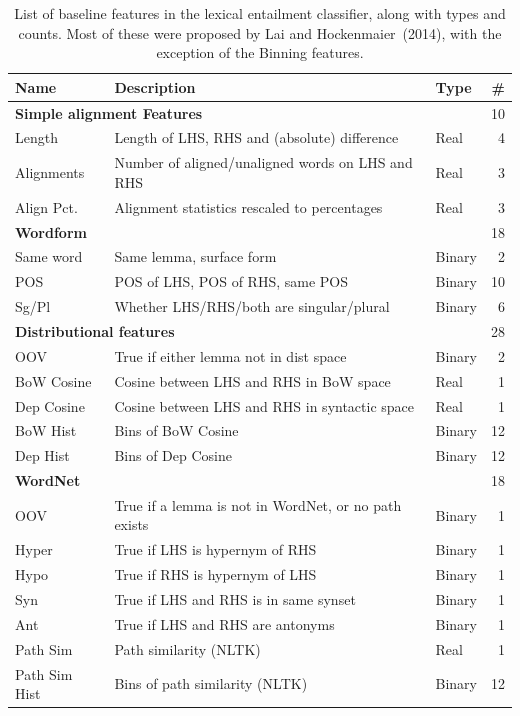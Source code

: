 \begin{table}
\centering
\begin{small}
\begin{tabular}{|lllr|}
    \hline
    \bf{Name} & \bf{Description} & \bf{Type} & \bf{\#}\\
    \hline\hline
    \multicolumn{3}{|l}{\bf{Simple alignment Features}} & 10 \\
    \hline
    Length & Length of LHS, RHS and (absolute) difference & Real & 4\\
    Alignments & Number of aligned/unaligned words on LHS and RHS & Real & 3\\
    Align Pct. & Alignment statistics rescaled to percentages & Real & 3\\
    \hline\hline
    \multicolumn{3}{|l}{\bf{Wordform}} & 18\\
    \hline
    Same word & Same lemma, surface form & Binary & 2\\
    POS & POS of LHS, POS of RHS, same POS & Binary & 10\\
    Sg/Pl & Whether LHS/RHS/both are singular/plural & Binary & 6\\
    \hline
    \hline
    \multicolumn{3}{|l}{\bf Distributional features} & 28\\
    \hline
    OOV & True if either lemma not in dist space & Binary & 2\\
    BoW Cosine & Cosine between LHS and RHS in BoW space & Real & 1\\
    Dep Cosine & Cosine between LHS and RHS in syntactic space & Real & 1\\
    BoW Hist & Bins of BoW Cosine & Binary & 12\\
    Dep Hist & Bins of Dep Cosine & Binary & 12\\
    \hline
    \hline
    \multicolumn{3}{|l}{\bf WordNet} & 18\\
    \hline
    OOV & True if a lemma is not in WordNet, or no path exists & Binary & 1\\
    Hyper & True if LHS is hypernym of RHS & Binary & 1\\
    Hypo & True if RHS is hypernym of LHS & Binary & 1\\
    Syn & True if LHS and RHS is in same synset & Binary & 1\\
    Ant & True if LHS and RHS are antonyms & Binary & 1\\
    Path Sim & Path similarity (NLTK) & Real & 1\\
    Path Sim Hist & Bins of path similarity (NLTK) & Binary & 12\\
    \hline
\end{tabular}
\caption{List of baseline features in the lexical entailment classifier, along
with types and counts. Most of these were proposed by Lai and Hockenmaier~(2014),
with the exception of the Binning features.}
\label{tab:lexentfeat}
\end{small}
\end{table}

